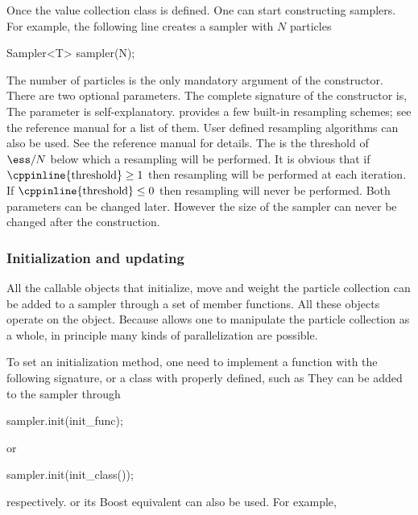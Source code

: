 Once the value collection class  is defined. One can start
constructing \smc samplers. For example, the following line creates a sampler
with $N$ particles
\begin{cppcode}
Sampler<T> sampler(N);
\end{cppcode}
The number of particles is the only mandatory argument of the constructor.
There are two optional parameters. The complete signature of the constructor
is,
The  parameter is self-explanatory. \vsmc provides a few
built-in resampling schemes; see the reference manual for a list of them. User
defined resampling algorithms can also be used. See the reference manual for
details. The  is the threshold of $\ess/N$ below which a
resampling will be performed. It is obvious that if
$\text{\cppinline{threshold}}\ge1$ then resampling will be performed at each
iteration. If $\text{\cppinline{threshold}}\le0$ then resampling will never be
performed. Both parameters can be changed later. However the size of the
sampler can never be changed after the construction.

\subsubsection{Initialization and updating}
\label{ssub:Initialization and updating}

All the callable objects that initialize, move and weight the particle
collection can be added to a sampler through a set of member functions. All
these objects operate on the  object. Because \vsmc
allows one to manipulate the particle collection as a whole, in principle many
kinds of parallelization are possible.

To set an initialization method, one need to implement a function with the
following signature,
or a class with  properly defined, such as
They can be added to the sampler through
\begin{cppcode}
sampler.init(init_func);
\end{cppcode}
or
\begin{cppcode}
sampler.init(init_class());
\end{cppcode}
respectively. \cppoo{}  or its Boost equivalent
 can also be used. For example,

